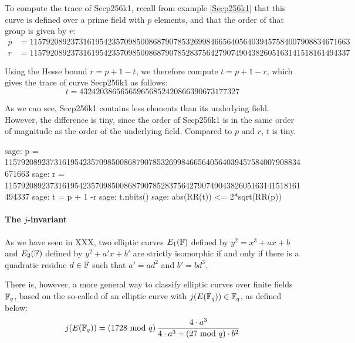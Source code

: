 \begin{example}\label{ex:Secp256k1-trace}To compute the trace of Secp256k1, recall from example \ref{Secp256k1} that this curve is defined over a prime field with $p$ elements, and that the order of that group is given by $r$:  
\begin{align*}
p &= \scriptstyle 115792089237316195423570985008687907853269984665640564039457584007908834671663\\
r &= \scriptstyle 115792089237316195423570985008687907852837564279074904382605163141518161494337
\end{align*}

Using the Hesse bound $r = p + 1 -t$, we therefore compute $t= p+1 -r$, which gives the trace of curve Secp256k1 as follows:
$$
t = \scriptstyle 432420386565659656852420866390673177327
$$

As we can see, Secp256k1 contains less elements than its underlying field. However,  the difference is tiny, since the order of Secp256k1 is in the same order of magnitude as the order of the underlying field. Compared to $p$ and $r$, $t$ is tiny.

\begin{sagecommandline}
sage: p = 115792089237316195423570985008687907853269984665640564039457584007908834671663
sage: r = 115792089237316195423570985008687907852837564279074904382605163141518161494337
sage: t = p + 1 -r
sage: t.nbits()
sage: abs(RR(t)) <= 2*sqrt(RR(p))
\end{sagecommandline}
\end{example} 

\paragraph{The $j$-invariant} As we have seen in XXX, two elliptic curves $E_1(\mathbb{F})$ defined by $y^2 = x^3 + ax +b$ and $E_2(\mathbb{F})$ defined by $y^2 + a'x + b'$ are strictly isomorphic if and only if there is a quadratic residue $d\in \mathbb{F}$ such that $a' = a d^2$ and $b' = b d^3$. 

There is, however, a more general way to classify elliptic curves over finite fields $\mathbb{F}_q$, based on the so-called  of an elliptic curve with $j(E(\mathbb{F}_q))\in\mathbb{F}_q$, as defined below:
\begin{equation}\label{eq:j-invariant1}
j(E(\mathbb{F}_q)) = \left(1728 \text{ mod } q\right) \frac{4\cdot a^3}{4\cdot a^3+ (27 \text{ mod } q)\cdot b^2}
\end{equation}

